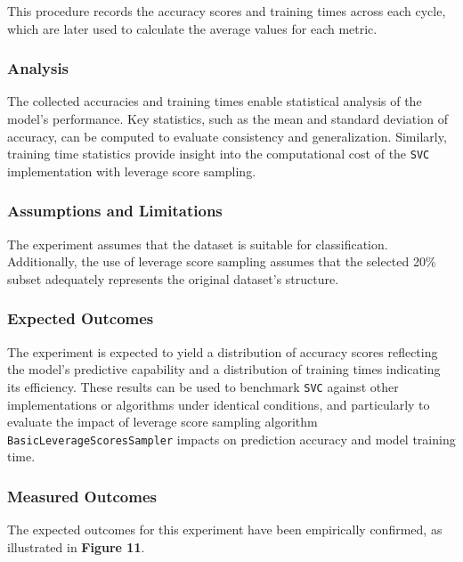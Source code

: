\documentclass{article}
\theoremstyle{plain}
\theoremstyle{definition}
\theoremstyle{remark}
\begin{document}
This procedure records the accuracy scores and training times across each cycle, which are later used to calculate the average values for each metric.

\subsubsection{Analysis}

The collected accuracies and training times enable statistical analysis of the model's performance. Key statistics, such as the mean and standard deviation of accuracy, can be computed to evaluate consistency and generalization. Similarly, training time statistics provide insight into the computational cost of the \texttt{SVC} implementation with leverage score sampling.

\subsubsection{Assumptions and Limitations}

The experiment assumes that the dataset is suitable for classification. Additionally, the use of leverage score sampling assumes that the selected 20\% subset adequately represents the original dataset's structure.

\subsubsection{Expected Outcomes}

The experiment is expected to yield a distribution of accuracy scores reflecting the model's predictive capability and a distribution of training times indicating its efficiency. These results can be used to benchmark \texttt{SVC} against other implementations or algorithms under identical conditions, and particularly to evaluate the impact of leverage score sampling algorithm \texttt{BasicLeverageScoresSampler} impacts on prediction accuracy and model training time.

\subsubsection{Measured Outcomes}

The expected outcomes for this experiment have been empirically confirmed, as illustrated in \textbf{Figure 11}.
\end{document}
